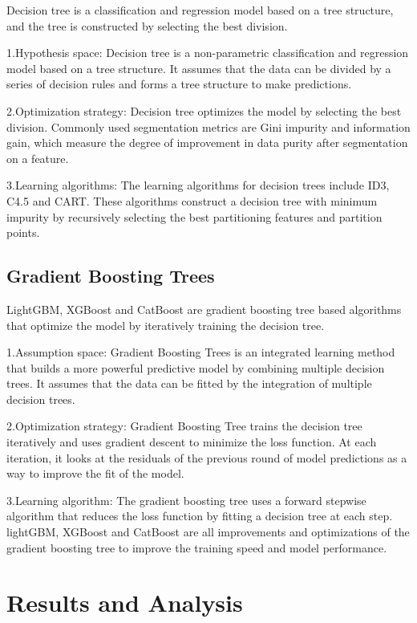 \documentclass[
  journal=medium,
  manuscript=Report,
  year=2023,
  volume=37,
]{cup-journal}
\begin{document}
Decision tree is a classification and regression model based on a tree structure, and the tree is constructed by selecting the best division.

1.Hypothesis space: Decision tree is a non-parametric classification and regression model based on a tree structure. It assumes that the data can be divided by a series of decision rules and forms a tree structure to make predictions.

2.Optimization strategy: Decision tree optimizes the model by selecting the best division. Commonly used segmentation metrics are Gini impurity and information gain, which measure the degree of improvement in data purity after segmentation on a feature.

3.Learning algorithms: The learning algorithms for decision trees include ID3, C4.5 and CART. These algorithms construct a decision tree with minimum impurity by recursively selecting the best partitioning features and partition points.

\subsection{Gradient Boosting Trees}

LightGBM, XGBoost and CatBoost are gradient boosting tree based algorithms that optimize the model by iteratively training the decision tree.

1.Assumption space: Gradient Boosting Trees is an integrated learning method that builds a more powerful predictive model by combining multiple decision trees. It assumes that the data can be fitted by the integration of multiple decision trees.

2.Optimization strategy: Gradient Boosting Tree trains the decision tree iteratively and uses gradient descent to minimize the loss function. At each iteration, it looks at the residuals of the previous round of model predictions as a way to improve the fit of the model.

3.Learning algorithm: The gradient boosting tree uses a forward stepwise algorithm that reduces the loss function by fitting a decision tree at each step. lightGBM, XGBoost and CatBoost are all improvements and optimizations of the gradient boosting tree to improve the training speed and model performance.

\section{Results and Analysis}
\end{document}
